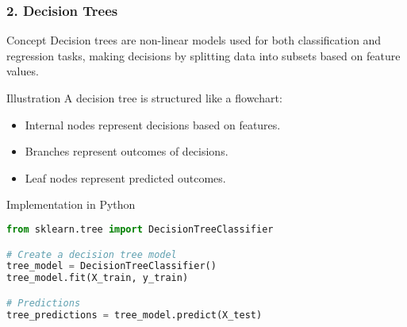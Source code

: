 \documentclass[aspectratio=169]{beamer}
\begin{document}
\begin{frame}[fragile]
    \frametitle{2. Decision Trees}
    \begin{block}{Concept}
        Decision trees are non-linear models used for both classification and regression tasks, making decisions by splitting data into subsets based on feature values.
    \end{block}

    \begin{block}{Illustration}
        A decision tree is structured like a flowchart:
        \begin{itemize}
            \item Internal nodes represent decisions based on features.
            \item Branches represent outcomes of decisions.
            \item Leaf nodes represent predicted outcomes.
        \end{itemize}
    \end{block}
    
    \begin{block}{Implementation in Python}
    \begin{lstlisting}[language=Python, frame=single]
from sklearn.tree import DecisionTreeClassifier

# Create a decision tree model
tree_model = DecisionTreeClassifier()
tree_model.fit(X_train, y_train)

# Predictions
tree_predictions = tree_model.predict(X_test)
    \end{lstlisting}
    \end{block}
\end{frame}
\end{document}
